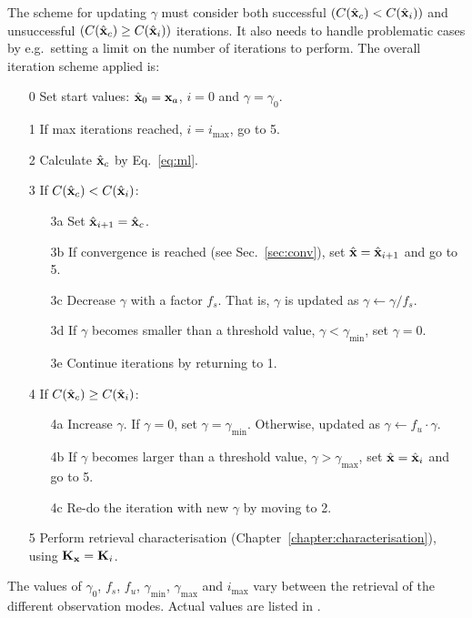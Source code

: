 The scheme for updating $\gamma$ must consider both successful
$(C(\hat{\mathbf{x}}_c) < C(\hat{\mathbf{x}}_i))$ and
unsuccessful $(C(\hat{\mathbf{x}}_c) \geq C(\hat{\mathbf{x}}_i))$ iterations. It also
needs to handle problematic cases by e.g.\ setting a limit on the number of
iterations to perform. The overall iteration scheme applied is:
\begin{itemize}
\item[0] Set start values: $\hat{\mathbf{x}}_0 = \mathbf{x}_{a}$, $i=0$ and $\gamma=\gamma_0$.
\item[1] If max iterations reached, $i=i_\mathrm{max}$, go to 5. 
\item[2] Calculate $\hat{\mathbf{x}}_c$ by Eq.~\ref{eq:ml}.
\item[3] If $C(\hat{\mathbf{x}}_c) < C(\hat{\mathbf{x}}_i)$:
  \begin{itemize}
  \item[3a] Set $\hat{\mathbf{x}}_{i+1}=\hat{\mathbf{x}}_c$.
  \item[3b] If convergence is reached (see Sec.~\ref{sec:conv}), set
    $\hat{\mathbf{x}}=\hat{\mathbf{x}}_{i+1}$ and go to 5.
  \item[3c] Decrease $\gamma$ with a factor $f_s$. That is, $\gamma$ is updated
    as $\gamma\leftarrow\gamma/f_s$. 
  \item[3d] If $\gamma$ becomes smaller than a 
    threshold value, $\gamma<\gamma_\mathrm{min}$, set $\gamma=0$.
  \item[3e] Continue iterations by returning to 1.
  \end{itemize}
\item[4] If $C(\hat{\mathbf{x}}_c) \geq C(\hat{\mathbf{x}}_i)$:
  \begin{itemize}
  \item[4a] Increase $\gamma$. If $\gamma=0$, set $\gamma=\gamma_\mathrm{min}$.
    Otherwise, updated as $\gamma\leftarrow f_u\cdot\gamma$.
  \item[4b] If $\gamma$ becomes larger than a threshold value,
    $\gamma>\gamma_\mathrm{max}$, set $\hat{\mathbf{x}}=\hat{\mathbf{x}}_i$ and go to 5.
  \item[4c] Re-do the iteration with new $\gamma$ by moving to 2.
  \end{itemize}
\item[5] Perform retrieval characterisation
  (Chapter~\ref{chapter:characterisation}), using $\mathbf{K}_{\mathbf{x}}=\mathbf{K}_{i}$.
\end{itemize}
The values of $\gamma_0$, $f_s$, $f_u$, $\gamma_\mathrm{min}$,
$\gamma_\mathrm{max}$ and $i_\mathrm{max}$ vary between the retrieval of the
different observation modes. Actual values are listed in \citet{atbdl2data}.



